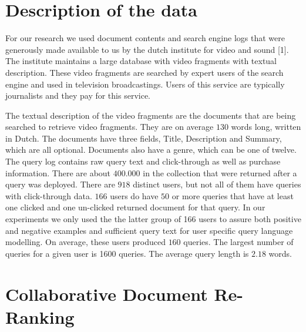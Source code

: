 \documentclass[12pt]{amsart}
\begin{document}
\section{Description of the data}
For our research we used document contents and search engine logs that were generously made available to us by the dutch institute for video and sound [1]. The institute maintains a large database with video fragments with textual description. These video fragments are searched by expert users of the search engine and used in television broadcastings. Users of this service are typically journalists and they pay for this service.

The textual description of the video fragments are the documents that are being searched to retrieve video fragments. They are on average $130$ words long, written in Dutch. The documents have three fields, Title, Description and Summary, which are all optional. Documents also have a genre, which can be one of twelve. The query log contains raw query text and click-through as well as purchase information.  There are about $400.000$ in the collection that were returned after a query was deployed. There are $918$ distinct users, but not all of them have queries with click-through data. $166$ users do have $50$ or more queries that have at least one clicked and one un-clicked returned document for that query. In our experiments we only used the the latter group of 166 users to assure both positive and negative examples and sufficient query text for user specific query language modelling. On average, these users produced $160$ queries. The largest number of queries for a given user is 1600 queries. The average query length is $2.18$ words.

\section{Collaborative Document Re-Ranking}
\end{document}
